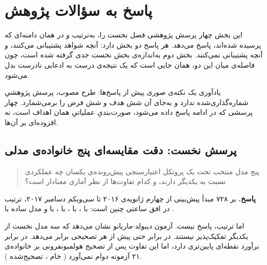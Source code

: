 
\section{پاسخ به سؤالات پژوهش}
\label{sec:4-7}

این بخش چهار پرسش پژوهشی فصل نخست را، به‌ترتیب و در همان دامنه‌ای که پرسیده
شده‌اند، پاسخ می‌دهد. هر پاسخ دو بخش دارد: آنچه شواهد پشتیبانی می‌کنند، و آنچه
پشتیبانی نمی‌کنند. بخش دوم به‌اندازه‌ی بخش نخست جدی گرفته شده است، چون فاصله‌ی
میان این دو، همان جایی است که یک نتیجه‌ی درست به ادعایی نادرست بدل می‌شود.

یادآوری یک نکته‌ی صوری پیش از پاسخ‌ها: طرح مصوب، پرسش پژوهشیِ شماره‌گذاری‌شده
ندارد و به‌جای آن شش هدف و شش فرض را برمی‌شمارد. چهار پرسشی که در ادامه پاسخ
داده می‌شود، صورت‌بندیِ عملیاتیِ همان اهداف است، نه افزوده‌ای بر آن‌ها.

\subsection*{پرسش نخست: دقت مقایسه‌ای پنج خانواده‌ی مدلی}

\begin{quote}
پنج مدل منتخب تحت یک پروتکل اعتبارسنجی پیش‌رونده‌ی یکسان چه عملکردی
نسبت به یکدیگر دارند، و کدام تفاوت‌ها از نظر آماری معنادار است؟
\end{quote}

\textbf{پاسخ.} بر ۷۲۸ مبدأ پیش‌بینی از چهارم ژانویه‌ی ۲۰۱۶ تا سی‌ویکم دسامبر
۲۰۱۷، ترتیب  در افق ساعتی چنین است:  با ،
 با ،  با ،  با
 و مدل ساده با .

اما ترتیب، پاسخ نیست. آزمون دیبولد-ماریانو نشان می‌دهد که سه مدل نخست از یکدیگر
تفکیک‌پذیر نیستند.  در برابر  حتی پیش از هر تصحیحی
 برابر  می‌دهد.  در برابر  برآورد
نقطه‌ای پایین‌تری دارد، اما این تفاوت پس از تصحیح هولمبونفرونی بر
خانواده‌ی ۲۱ آزمونه دوام نمی‌آورد ( خام ،  تصحیح‌شده
).

